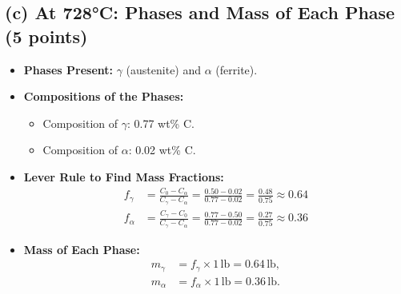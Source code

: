 \documentclass[12pt]{article}
\begin{document}
\subsection*{(c) At 728°C: Phases and Mass of Each Phase (5 points)}
\begin{itemize}
    \item \textbf{Phases Present:} \(\gamma\) (austenite) and \(\alpha\) (ferrite).
    \item \textbf{Compositions of the Phases:}
    \begin{itemize}
        \item Composition of \(\gamma\): 0.77 wt\% C.
        \item Composition of \(\alpha\): 0.02 wt\% C.
    \end{itemize}
    \item \textbf{Lever Rule to Find Mass Fractions:}
    \begin{align*}
        f_\gamma &= \frac{C_0 - C_\alpha}{C_\gamma - C_\alpha} = \frac{0.50 - 0.02}{0.77 - 0.02} = \frac{0.48}{0.75} \approx 0.64 \\
        f_\alpha &= \frac{C_\gamma - C_0}{C_\gamma - C_\alpha} = \frac{0.77 - 0.50}{0.77 - 0.02} = \frac{0.27}{0.75} \approx 0.36
    \end{align*}
    \item \textbf{Mass of Each Phase:}
    \begin{align*}
        m_\gamma &= f_\gamma \times 1 \, \text{lb} = 0.64 \, \text{lb}, \\
        m_\alpha &= f_\alpha \times 1 \, \text{lb} = 0.36 \, \text{lb}.
    \end{align*}
\end{itemize}
\end{document}
